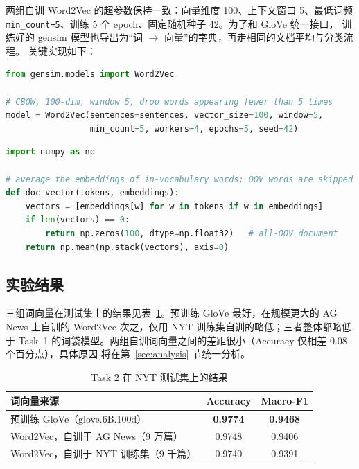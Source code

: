 \documentclass[a4paper]{article}
\begin{document}
两组自训 Word2Vec 的超参数保持一致：向量维度 100、上下文窗口 5、最低词频
\texttt{min\_count=5}、训练 5 个 epoch、固定随机种子 42。为了和 GloVe 统一接口，
训练好的 gensim 模型也导出为“词 $\rightarrow$ 向量”的字典，再走相同的文档平均与分类流程。
关键实现如下：

\begin{lstlisting}[language=Python]
from gensim.models import Word2Vec

# CBOW, 100-dim, window 5, drop words appearing fewer than 5 times
model = Word2Vec(sentences=sentences, vector_size=100, window=5,
                 min_count=5, workers=4, epochs=5, seed=42)
\end{lstlisting}

\begin{lstlisting}[language=Python]
import numpy as np

# average the embeddings of in-vocabulary words; OOV words are skipped
def doc_vector(tokens, embeddings):
    vectors = [embeddings[w] for w in tokens if w in embeddings]
    if len(vectors) == 0:
        return np.zeros(100, dtype=np.float32)   # all-OOV document
    return np.mean(np.stack(vectors), axis=0)
\end{lstlisting}

\subsection{实验结果}

三组词向量在测试集上的结果见表~\ref{tab:res-task2}。预训练 GloVe 最好，在规模更大的
AG News 上自训的 Word2Vec 次之，仅用 NYT 训练集自训的略低；三者整体都略低于 Task~1
的词袋模型。两组自训词向量之间的差距很小（Accuracy 仅相差 0.08 个百分点），具体原因
将在第~\ref{sec:analysis} 节统一分析。

\begin{table}[H]
  \centering
  \caption{Task 2 在 NYT 测试集上的结果}
  \label{tab:res-task2}
  \begin{tabular}{l c c}
    \toprule
    词向量来源 & Accuracy & Macro-F1 \\
    \midrule
    预训练 GloVe（glove.6B.100d）       & \textbf{0.9774} & \textbf{0.9468} \\
    Word2Vec，自训于 AG News（9 万篇）  & 0.9748 & 0.9406 \\
    Word2Vec，自训于 NYT 训练集（9 千篇）& 0.9740 & 0.9391 \\
    \bottomrule
  \end{tabular}
\end{table}
\end{document}
